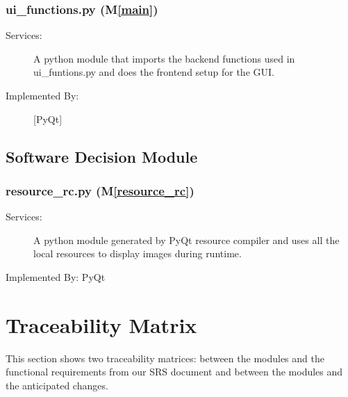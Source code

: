 \documentclass[12pt, titlepage]{article}
\newcommand{\mref}[1]{M\ref{#1}}
\begin{document}
\subsubsection{ui\_functions.py (\mref{main})}
\begin{description}
\item[Services:] A python module that imports the backend functions used in ui\_funtions.py and does the frontend setup for the GUI.
\item[Implemented By:] [PyQt]
\end{description}

\subsection{Software Decision Module}

\subsubsection{resource\_rc.py (\mref{resource_rc})}

\begin{description}

  \item[Services:] A python module generated by PyQt resource compiler and uses all the local resources to display images during runtime.
  \item[Implemented By: PyQt] 
  \end{description}

\newpage
\section{Traceability Matrix} \label{SecTM}

This section shows two traceability matrices: between the modules and the
functional requirements from our SRS document and between the modules and the anticipated changes.
\end{document}
